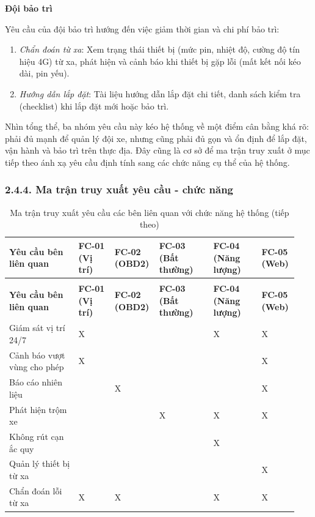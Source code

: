\documentclass[a4paper]{extarticle}
\newcommand{\thesissettableid}[2]{%
  \renewcommand{\thetable}{#1}%
  \renewcommand{\theHtable}{#2}%
}
\providecommand{\tightlist}{%
  \setlength{\itemsep}{0pt}\setlength{\parskip}{0pt}}
\begin{document}
\textbf{Đội bảo trì}

Yêu cầu của đội bảo trì hướng đến việc giảm thời gian và chi phí bảo
trì:

\begin{enumerate}
\def\labelenumi{\arabic{enumi}.}
\tightlist
\item
  \emph{Chẩn đoán từ xa}: Xem trạng thái thiết bị (mức pin, nhiệt độ,
  cường độ tín hiệu 4G) từ xa, phát hiện và cảnh báo khi thiết bị gặp
  lỗi (mất kết nối kéo dài, pin yếu).
\item
  \emph{Hướng dẫn lắp đặt}: Tài liệu hướng dẫn lắp đặt chi tiết, danh
  sách kiểm tra (checklist) khi lắp đặt mới hoặc bảo trì.
\end{enumerate}

Nhìn tổng thể, ba nhóm yêu cầu này kéo hệ thống về một điểm cân bằng khá
rõ: phải đủ mạnh để quản lý đội xe, nhưng cũng phải đủ gọn và ổn định để
lắp đặt, vận hành và bảo trì trên thực địa. Đây cũng là cơ sở để ma trận
truy xuất ở mục tiếp theo ánh xạ yêu cầu định tính sang các chức năng cụ
thể của hệ thống.

\subsubsection{2.4.4. Ma trận truy xuất yêu cầu - chức
năng}\label{244-ma-trux1eadn-truy-xuux1ea5t-yuxeau-cux1ea7u---chux1ee9c-nux103ng}


{\thesissettableid{2.6}{tab-ch2-ma-tran-truy-xuat-yeu-cau-cac-ben-lien-quan-voi-chuc}
\def\LTcaptype{table}
\begin{longtable}{|L{0.237\linewidth}|L{0.122\linewidth}|L{0.122\linewidth}|L{0.186\linewidth}|L{0.168\linewidth}|L{0.101\linewidth}|}
\caption{Ma trận truy xuất yêu cầu các bên liên quan với chức năng hệ thống}\label{tab:ch2-ma-tran-truy-xuat-yeu-cau-cac-ben-lien-quan-voi-chuc}\\
\hline \textbf{Yêu cầu bên liên quan} & \textbf{FC-01 (Vị trí)} & \textbf{FC-02 (OBD2)} & \textbf{FC-03 (Bất
thường)} & \textbf{FC-04 (Năng lượng)} & \textbf{FC-05 (Web)} \\
\hline
\endfirsthead
\caption[]{Ma trận truy xuất yêu cầu các bên liên quan với chức năng hệ thống (tiếp theo)}\\
\hline \textbf{Yêu cầu bên liên quan} & \textbf{FC-01 (Vị trí)} & \textbf{FC-02 (OBD2)} & \textbf{FC-03 (Bất
thường)} & \textbf{FC-04 (Năng lượng)} & \textbf{FC-05 (Web)} \\
\hline
\endhead
\hline
\endfoot
\endlastfoot
Giám sát vị trí 24/7 & X & & & X & X \\\hline
Cảnh báo vượt vùng cho phép & X & & & & X \\\hline
Báo cáo nhiên liệu & & X & & & X \\\hline
Phát hiện trộm xe & & & X & X & X \\\hline
Không rút cạn ắc quy & & & & X & \\\hline
Quản lý thiết bị từ xa & & & & & X \\\hline
Chẩn đoán lỗi từ xa & X & X & & X & X \\\hline
\end{longtable}
}
\end{document}
